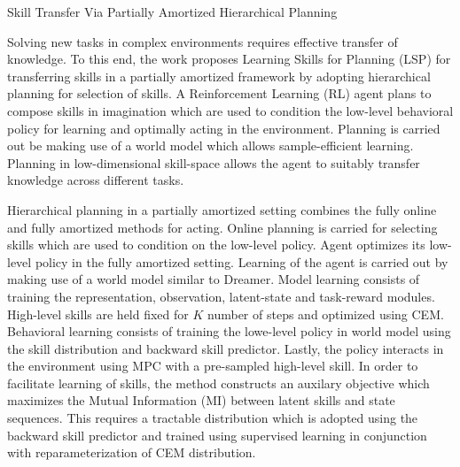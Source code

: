 \documentclass[11pt,letterpaper]{article}
\begin{document}
\begin{center}
  \large{Skill Transfer Via Partially Amortized Hierarchical Planning}
\end{center}

Solving new tasks in complex environments requires effective transfer of knowledge. To this end, the work proposes Learning Skills for Planning (LSP) for transferring skills in a partially amortized framework by adopting hierarchical planning for selection of skills. A Reinforcement Learning (RL) agent plans to compose skills in imagination which are used to condition the low-level behavioral policy for learning and optimally acting in the environment. Planning is carried out be making use of a world model which allows sample-efficient learning. Planning in low-dimensional skill-space allows the agent to suitably transfer knowledge across different tasks. 

Hierarchical planning in a partially amortized setting combines the fully online and fully amortized methods for acting. Online planning is carried for selecting skills which are used to condition on the low-level policy. Agent optimizes its low-level policy in the fully amortized setting. Learning of the agent is carried out by making use of a world model similar to Dreamer. Model learning consists of training the representation, observation, latent-state and task-reward modules. High-level skills are held fixed for $K$ number of steps and optimized using CEM. Behavioral learning consists of training the lowe-level policy in world model using the skill distribution and backward skill predictor. Lastly, the policy interacts in the environment using MPC with a pre-sampled high-level skill. In order to facilitate learning of skills, the method constructs an auxilary objective which maximizes the Mutual Information (MI) between latent skills and state sequences. This requires a tractable distribution which is adopted using the backward skill predictor and trained using supervised learning in conjunction with reparameterization of CEM distribution. 
\end{document}
